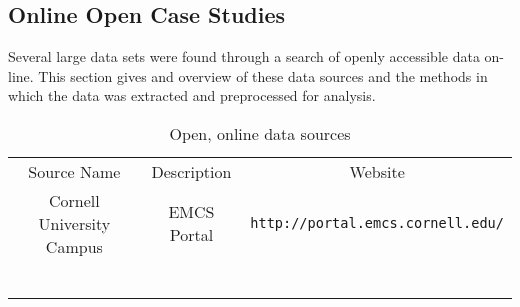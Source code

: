 \subsection{Online Open Case Studies}

Several large data sets were found through a search of openly accessible data on-line. This section gives and overview of these data sources and the methods in which the data was extracted and preprocessed for analysis.

\begin{table} 
    \begin{tabular}{ c c c }
        Source Name & Description & Website\\ 
        Cornell University Campus & EMCS Portal & \verb|http://portal.emcs.cornell.edu/| \\ 
         &  &  \\ 
         &  &  \\ 
         &  &  \\ 
         &  &  \\ 
         &  &  \\ 
         &  &  \\ 
    \end{tabular} 
    \caption{Open, online data sources} 
\end{table}